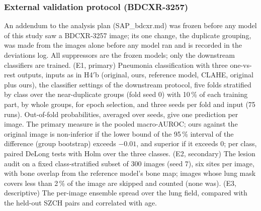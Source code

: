 \subsubsection{External validation protocol (BDCXR-3257)}
\label{sec:m-bdcxr}
An addendum to the analysis plan (SAP\_bdcxr.md) was frozen before any model of this study saw a BDCXR-3257 image; its one change, the
duplicate grouping, was made from the images alone before any model ran and is recorded in the deviations log. All suppressors are the
frozen models; only the downstream classifiers are trained. (E1, primary) Pneumonia classification with three one-vs-rest outputs, inputs as
in H4$'$b (original, ours, reference model, CLAHE, original plus ours), the classifier settings of the downstream protocol, five folds
stratified by class over the near-duplicate groups (fold seed 0) with 10\,\% of each training part, by whole groups, for epoch selection,
and three seeds per fold and input (75 runs). Out-of-fold probabilities, averaged over seeds, give one prediction per image. The primary
measure is the pooled macro-AUROC; ours against the original image is non-inferior if the lower bound of the 95\,\% interval of the
difference (group bootstrap) exceeds $-0.01$, and superior if it exceeds 0; per class, paired DeLong tests with Holm over the three classes.
(E2, secondary) The lesion audit on a fixed class-stratified subset of 300 images (seed 7), six sites per image, with bone overlap from the
reference model's bone map; images whose lung mask covers less than 2\,\% of the image are skipped and counted (none was). (E3,
descriptive) The per-image ensemble spread over the lung field, compared with the held-out SZCH pairs and correlated with age.


